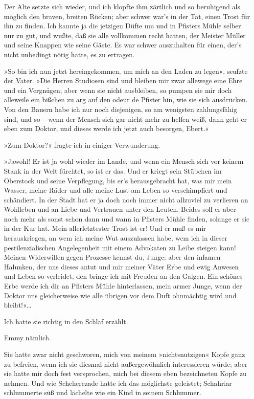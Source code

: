 Der Alte setzte sich wieder, und ich klopfte ihm zärtlich und so
beruhigend als möglich den braven, breiten Rücken; aber schwer
war's in der Tat, einen Trost für ihn zu finden. Ich kannte ja die
jetzigen Düfte um und in Pfisters Mühle selber nur zu gut, und
wußte, daß sie alle vollkommen recht hatten, der Meister Müller und
seine Knappen wie seine Gäste. Es war schwer auszuhalten für einen,
der's nicht unbedingt nötig hatte, es zu ertragen.

»So bin ich nun jetzt hereingekommen, um mich an den Laden zu
legen«, seufzte der Vater. »Die Herren Studiosen sind und bleiben
mir zwar allewege eine Ehre und ein Vergnügen; aber wenn sie nicht
ausbleiben, so pumpen sie mir doch alleweile ein bißchen zu arg auf
den odeur de Pfister hin, wie sie sich ausdrücken. Von den Bauern
habe ich nur noch diejenigen, so am wenigsten zahlungsfähig sind,
und so – wenn der Mensch sich gar nicht mehr zu helfen weiß, dann
geht er eben zum Doktor, und dieses werde ich jetzt auch besorgen,
Ebert.«

»Zum Doktor?« fragte ich in einiger Verwunderung.

»Jawohl! Er ist ja wohl wieder im Lande, und wenn ein Mensch sich
vor keinem Stank in der Welt fürchtet, so ist er das. Und er kriegt
sein Stübchen im Oberstock und seine Verpflegung, bis er's
herausgebracht hat, was mir mein Wasser, meine Räder und alle meine
Lust am Leben so verschimpfiert und schändiert. In der Stadt hat er
ja doch noch immer nicht allzuviel zu verlieren an Wohlleben und an
Liebe und Vertrauen unter den Leuten. Beides soll er aber noch mehr
als sonst schon dann und wann in Pfisters Mühle finden, solange er
sie in der Kur hat. Mein allerletztester Trost ist er! Und er muß
es mir herauskriegen, an wem ich meine Wut auszulassen habe, wem
ich in dieser pestilenzialischen Angelegenheit mit einem Advokaten
zu Leibe steigen kann! Meinen Widerwillen gegen Prozesse kennst du,
Junge; aber den infamen Halunken, der uns dieses antut und mir
meiner Väter Erbe und ewig Anwesen und Leben so verleidet, den
bringe ich mit Freuden an den Galgen. Ein schönes Erbe werde ich
dir an Pfisters Mühle hinterlassen, mein armer Junge, wenn der
Doktor uns gleicherweise wie alle übrigen vor dem Duft ohnmächtig
wird und bleibt!«\ldots{}

Ich hatte sie richtig in den Schlaf erzählt.

Emmy nämlich.

Sie hatte zwar nicht geschworen, mich von meinem »nichtsnutzigen«
Kopfe ganz zu befreien, wenn ich sie diesmal nicht außergewöhnlich
interessieren würde; aber sie hatte mir doch fest versprochen, mich
bei diesem eben bezeichneten Kopfe zu nehmen. Und wie Scheherezade
hatte ich das möglichste geleistet; Schahriar schlummerte süß und
lächelte wie ein Kind in seinem Schlummer.


